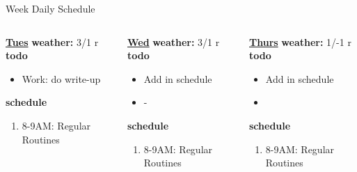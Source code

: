 \begin{columns}
\begin{column}{0.6\linewidth}
\begin{block}{Week Daily Schedule}
\begin{columns}
          \begin{column}{0.14\textwidth}{\small \underline{\bf Tues}}
            {\bf {\tiny  weather:} } {\tiny 3/1 r} \\ 
            {\bf {\tiny todo}}\\ 
            \begin{itemize}
              \tiny \item \tiny Work: do write-up  
            \end{itemize} 
                {{\bf {\tiny  schedule}}}
                \begin{enumerate} 
                  \tiny \item \tiny 8-9AM: Regular Routines 
                \end{enumerate} 
          \end{column}
          \begin{column}{0.14\textwidth}{\small \underline{\bf Wed}}
            {\tiny \bf weather: } {\tiny 3/1 r} \\ 
            {\tiny {\bf todo}}\\
            \begin{itemize}
              \tiny \item \tiny Add in schedule
            \item \tiny -
            \end{itemize} 
                {\tiny \bf schedule}\\
                \begin{enumerate} 
                  \tiny \item \tiny 8-9AM: Regular Routines 
                \end{enumerate} 
          \end{column}

          \begin{column}{0.14\textwidth}{\small \underline{\bf Thurs}}
            {\tiny \bf weather: } {\tiny 1/-1 r }\\ 
            {\tiny \bf todo} \\ 
            \begin{itemize}
              \tiny \item \tiny Add in schedule
            \item \tiny 
            \end{itemize} 
                {\tiny {\bf schedule}} \\
                \begin{enumerate} 
                  \tiny \item \tiny 8-9AM: Regular Routines 
                \end{enumerate}
          \end{column} 
          

\end{columns}
\end{block}
\end{column}
\end{columns}
